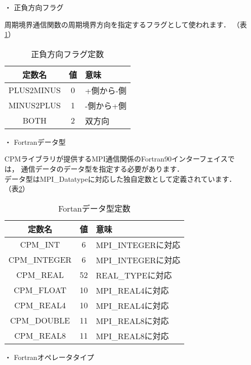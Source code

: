 \begin{itemize}
\item[・] {正負方向フラグ}

周期境界通信関数の周期境界方向を指定するフラグとして使われます．
（表\ref{tbl:PMFlagF}）\\

\begin{table}[htb]
\begin{center}
\caption{正負方向フラグ定数}
\label{tbl:PMFlagF}
\begin{tabular}{|c|c|l|}
\hline 
定数名 & 値 & 意味\\
\hline
PLUS2MINUS & 0 & +側から-側\\
MINUS2PLUS & 1 & -側から+側\\
BOTH       & 2 & 双方向\\
\hline
\end{tabular}
\end{center}
\end{table}


\item[・] {Fortranデータ型}

CPMライブラリが提供するMPI通信関係のFortran90インターフェイスでは，
通信データのデータ型を指定する必要があります．\\
データ型はMPI\_Datatypeに対応した独自定数として定義されています．
（表\ref{tbl:dataTypeF}）\\

\begin{table}[htb]
\begin{center}
\caption{Fortanデータ型定数}
\label{tbl:dataTypeF}
\begin{tabular}{|c|c|l|}
\hline 
定数名 & 値 & 意味\\
\hline
CPM\_INT     &  6 & MPI\_INTEGERに対応\\
CPM\_INTEGER &  6 & MPI\_INTEGERに対応\\
CPM\_REAL    & 52 & REAL\_TYPEに対応\\
CPM\_FLOAT   & 10 & MPI\_REAL4に対応\\
CPM\_REAL4   & 10 & MPI\_REAL4に対応\\
CPM\_DOUBLE  & 11 & MPI\_REAL8に対応\\
CPM\_REAL8   & 11 & MPI\_REAL8に対応\\
\hline
\end{tabular}
\end{center}
\end{table}


\item[・] {Fortranオペレータタイプ}


\end{itemize}
